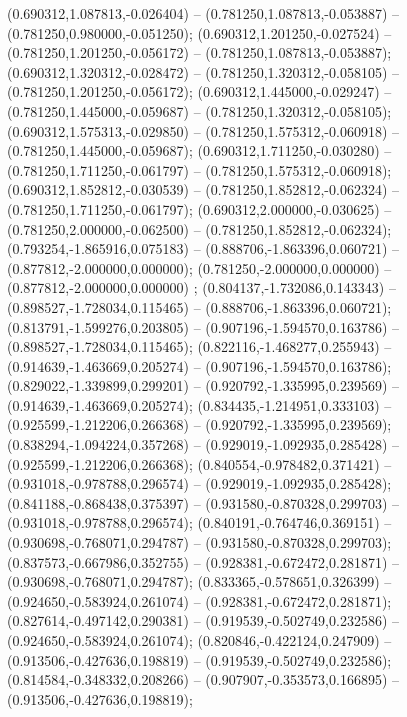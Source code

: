  (0.690312,1.087813,-0.026404) -- (0.781250,1.087813,-0.053887) -- (0.781250,0.980000,-0.051250);
 (0.690312,1.201250,-0.027524) -- (0.781250,1.201250,-0.056172) -- (0.781250,1.087813,-0.053887);
 (0.690312,1.320312,-0.028472) -- (0.781250,1.320312,-0.058105) -- (0.781250,1.201250,-0.056172);
 (0.690312,1.445000,-0.029247) -- (0.781250,1.445000,-0.059687) -- (0.781250,1.320312,-0.058105);
 (0.690312,1.575313,-0.029850) -- (0.781250,1.575312,-0.060918) -- (0.781250,1.445000,-0.059687);
 (0.690312,1.711250,-0.030280) -- (0.781250,1.711250,-0.061797) -- (0.781250,1.575312,-0.060918);
 (0.690312,1.852812,-0.030539) -- (0.781250,1.852812,-0.062324) -- (0.781250,1.711250,-0.061797);
 (0.690312,2.000000,-0.030625) -- (0.781250,2.000000,-0.062500) -- (0.781250,1.852812,-0.062324);
 (0.793254,-1.865916,0.075183) -- (0.888706,-1.863396,0.060721) -- (0.877812,-2.000000,0.000000);
 (0.781250,-2.000000,0.000000) -- (0.877812,-2.000000,0.000000) ;
 (0.804137,-1.732086,0.143343) -- (0.898527,-1.728034,0.115465) -- (0.888706,-1.863396,0.060721);
 (0.813791,-1.599276,0.203805) -- (0.907196,-1.594570,0.163786) -- (0.898527,-1.728034,0.115465);
 (0.822116,-1.468277,0.255943) -- (0.914639,-1.463669,0.205274) -- (0.907196,-1.594570,0.163786);
 (0.829022,-1.339899,0.299201) -- (0.920792,-1.335995,0.239569) -- (0.914639,-1.463669,0.205274);
 (0.834435,-1.214951,0.333103) -- (0.925599,-1.212206,0.266368) -- (0.920792,-1.335995,0.239569);
 (0.838294,-1.094224,0.357268) -- (0.929019,-1.092935,0.285428) -- (0.925599,-1.212206,0.266368);
 (0.840554,-0.978482,0.371421) -- (0.931018,-0.978788,0.296574) -- (0.929019,-1.092935,0.285428);
 (0.841188,-0.868438,0.375397) -- (0.931580,-0.870328,0.299703) -- (0.931018,-0.978788,0.296574);
 (0.840191,-0.764746,0.369151) -- (0.930698,-0.768071,0.294787) -- (0.931580,-0.870328,0.299703);
 (0.837573,-0.667986,0.352755) -- (0.928381,-0.672472,0.281871) -- (0.930698,-0.768071,0.294787);
 (0.833365,-0.578651,0.326399) -- (0.924650,-0.583924,0.261074) -- (0.928381,-0.672472,0.281871);
 (0.827614,-0.497142,0.290381) -- (0.919539,-0.502749,0.232586) -- (0.924650,-0.583924,0.261074);
 (0.820846,-0.422124,0.247909) -- (0.913506,-0.427636,0.198819) -- (0.919539,-0.502749,0.232586);
 (0.814584,-0.348332,0.208266) -- (0.907907,-0.353573,0.166895) -- (0.913506,-0.427636,0.198819);
